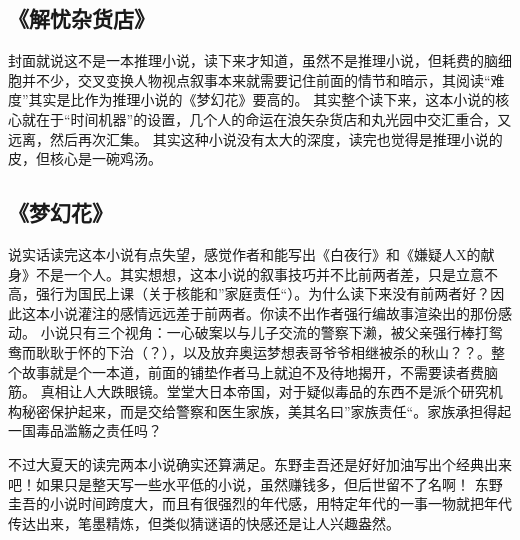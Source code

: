 \subsection{《解忧杂货店》}

封面就说这不是一本推理小说，读下来才知道，虽然不是推理小说，但耗费的脑细胞并不少，交叉变换人物视点叙事本来就需要记住前面的情节和暗示，其阅读“难度”其实是比作为推理小说的《梦幻花》要高的。 
其实整个读下来，这本小说的核心就在于“时间机器”的设置，几个人的命运在浪矢杂货店和丸光园中交汇重合，又远离，然后再次汇集。 
其实这种小说没有太大的深度，读完也觉得是推理小说的皮，但核心是一碗鸡汤。

\subsection{《梦幻花》}

说实话读完这本小说有点失望，感觉作者和能写出《白夜行》和《嫌疑人X的献身》不是一个人。其实想想，这本小说的叙事技巧并不比前两者差，只是立意不高，强行为国民上课（关于核能和”家庭责任“）。为什么读下来没有前两者好？因此这本小说灌注的感情远远差于前两者。你读不出作者强行编故事渲染出的那份感动。 
小说只有三个视角：一心破案以与儿子交流的警察下濑，被父亲强行棒打鸳鸯而耿耿于怀的下治（？），以及放弃奥运梦想表哥爷爷相继被杀的秋山？？。整个故事就是个一本道，前面的铺垫作者马上就迫不及待地揭开，不需要读者费脑筋。 
真相让人大跌眼镜。堂堂大日本帝国，对于疑似毒品的东西不是派个研究机构秘密保护起来，而是交给警察和医生家族，美其名曰”家族责任“。家族承担得起一国毒品滥觞之责任吗？

不过大夏天的读完两本小说确实还算满足。东野圭吾还是好好加油写出个经典出来吧！如果只是整天写一些水平低的小说，虽然赚钱多，但后世留不了名啊！ 
东野圭吾的小说时间跨度大，而且有很强烈的年代感，用特定年代的一事一物就把年代传达出来，笔墨精炼，但类似猜谜语的快感还是让人兴趣盎然。